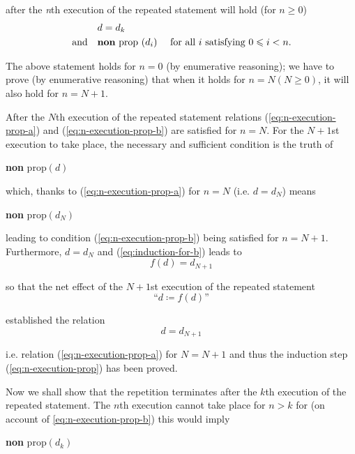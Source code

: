 \documentclass[twoside,11pt]{book}
\begin{document}
\quad after the \textit{n}th execution of the repeated statement will hold (for $n \geqslant 0$)
\begin{subequations}
	\label{eq:n-execution-prop}
	\begin{align}
		\label{eq:n-execution-prop-a}
		&d=d_k& \\
		\label{eq:n-execution-prop-b}
		\text{and}\quad &\text{\textbf{non} prop }(d_i) &\text{ for all } i \text{ satisfying } 0 \leqslant i < n.
	\end{align}
\end{subequations}

The above statement holds for $n = 0$ (by enumerative reasoning); we have to prove (by enumerative reasoning) that when it holds for $n = N(N \geqslant 0)$, it will also hold for $n = N + 1$.

After the $N$th execution of the repeated statement relations (\ref{eq:n-execution-prop-a}) and (\ref{eq:n-execution-prop-b}) are satisfied for $n = N$. For the $N + 1$st execution to take place, the necessary and sufficient condition is the truth of
\begin{center}
	\textbf{non} prop$(d)$
\end{center}

\noindent
which, thanks to (\ref{eq:n-execution-prop-a}) for $n = N$ (i.e. $d = d_N$) means
\begin{center}
	\textbf{non} prop$(d_N)$
\end{center}

\noindent 
leading to condition (\ref{eq:n-execution-prop-b}) being satisfied for $n = N + 1$. Furthermore, $d = d_N$ and (\ref{eq:induction-for-b}) leads to
$$
f(d) = d_{N + 1}
$$

\noindent
so that the net effect of the $N + 1$st execution of the repeated statement
$$
\text{``}d \coloneq f(d)\text{''}
$$

\noindent
established the relation
$$
d = d_{N + 1}
$$

\noindent
i.e. relation (\ref{eq:n-execution-prop-a}) for $N = N + 1$ and thus the induction step (\ref{eq:n-execution-prop}) has been
proved.

Now we shall show that the repetition terminates after the $k$th execution of the repeated statement. The $n$th execution cannot take place for $n > k$
for (on account of \ref{eq:n-execution-prop-b}) this would imply
\begin{center}
	\textbf{non} prop$(d_k)$
\end{center}
\end{document}
